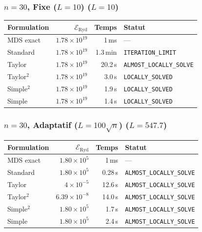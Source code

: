 \subsubsection{$n=30$, Fixe ($L{=}10$) ($L=10$)}
\begin{longtable}{@{}lrrl@{}}
  \toprule
  Formulation & $\mathcal{E}_{\mathrm{Ryd}}$ & Temps & Statut \\
  \midrule
  \endhead
  MDS exact & $1.78\times10^{19}$ & 1\,ms & --- \\
  Standard & $1.78\times10^{19}$ & 1.3\,min & \texttt{ITERATION\_LIMIT} \\
  Taylor & $1.78\times10^{19}$ & 20.2\,s & \texttt{ALMOST\_LOCALLY\_SOLVE} \\
  Taylor$^2$ & $1.78\times10^{19}$ & 3.0\,s & \texttt{LOCALLY\_SOLVED} \\
  Simple$^2$ & $1.78\times10^{19}$ & 1.9\,s & \texttt{LOCALLY\_SOLVED} \\
  Simple & $1.78\times10^{19}$ & 1.4\,s & \texttt{LOCALLY\_SOLVED} \\
  \bottomrule
\end{longtable}

\subsubsection{$n=30$, Adaptatif ($L{=}100\sqrt{n}$) ($L=547.7$)}
\begin{longtable}{@{}lrrl@{}}
  \toprule
  Formulation & $\mathcal{E}_{\mathrm{Ryd}}$ & Temps & Statut \\
  \midrule
  \endhead
  MDS exact & $1.80\times10^{5}$ & 1\,ms & --- \\
  Standard & $1.80\times10^{5}$ & 0.28\,s & \texttt{ALMOST\_LOCALLY\_SOLVE} \\
  Taylor & $4\times10^{-5}$ & 12.6\,s & \texttt{ALMOST\_LOCALLY\_SOLVE} \\
  Taylor$^2$ & $6.39\times10^{-8}$ & 14.0\,s & \texttt{ALMOST\_LOCALLY\_SOLVE} \\
  Simple$^2$ & $1.80\times10^{5}$ & 1.7\,s & \texttt{ALMOST\_LOCALLY\_SOLVE} \\
  Simple & $1.80\times10^{5}$ & 2.4\,s & \texttt{ALMOST\_LOCALLY\_SOLVE} \\
  \bottomrule
\end{longtable}

